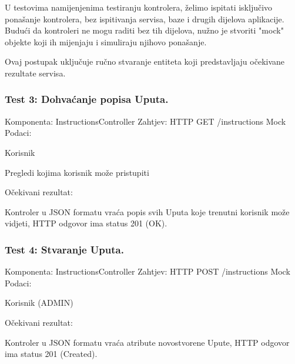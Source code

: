 			U testovima namijenjenima testiranju kontrolera, želimo ispitati isključivo ponašanje kontrolera, bez ispitivanja servisa, baze i drugih dijelova aplikacije.
			Budući da kontroleri ne mogu raditi bez tih dijelova, nužno je stvoriti "mock" objekte koji ih mijenjaju i simuliraju njihovo ponašanje.

			Ovaj postupak uključuje ručno stvaranje entiteta koji predstavljaju očekivane rezultate servisa.

			\subsubsection*{Test 3: Dohvaćanje popisa Uputa.}
			Komponenta: InstructionsController \newline
			Zahtjev: HTTP GET /instructions \newline
			Mock Podaci:
			\begin{packed_item}
				\item Korisnik
				\item Pregledi kojima korisnik može pristupiti
			\end{packed_item}
			Očekivani rezultat:
			\begin{packed_item}
				\item Kontroler u JSON formatu vraća popis svih Uputa koje trenutni korisnik može vidjeti, HTTP odgovor ima status 201 (OK).
			\end{packed_item}
			
			
			\subsubsection*{Test 4: Stvaranje Uputa.}
			Komponenta: InstructionsController \newline
			Zahtjev: HTTP POST /instructions \newline
			Mock Podaci:
			\begin{packed_item}
				\item Korisnik (ADMIN)
			\end{packed_item}
			Očekivani rezultat:
			\begin{packed_item}
				\item Kontroler u JSON formatu vraća atribute novostvorene Upute, HTTP odgovor ima status 201 (Created).
			\end{packed_item}
			


